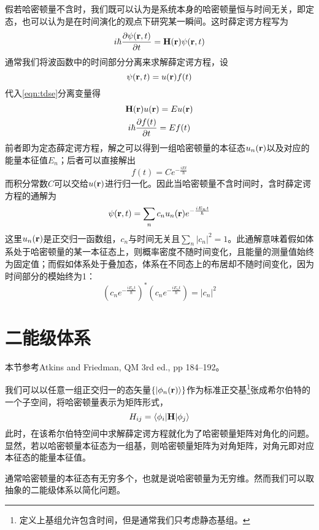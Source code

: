 假若哈密顿量不含时，我们既可以认为是系统本身的哈密顿量恒与时间无关，即定态，也可以认为是在时间演化的观点下研究某一瞬间。这时薛定谔方程写为
\begin{equation}\label{eqn:tdse}
i\hbar \dfrac{\partial \psi(\bm{\mathrm{r}},t)}{\partial t}=\bm{\mathrm{H}}(\bm{\mathrm{r}}) \psi(\bm{\mathrm{r}},t)
\end{equation}
通常我们将波函数中的时间部分分离来求解薛定谔方程，设
\begin{equation}\label{key}
\psi(\bm{\mathrm{r}},t)=u(\bm{\mathrm{r}})f(t)
\end{equation}
代入\eqref{eqn:tdse}分离变量得
\begin{gather}
\bm{\mathrm{H}}(\bm{\mathrm{r}}) u(\bm{\mathrm{r}})=E u(\bm{\mathrm{r}})\label{eqn:TISE}\\
i\hbar \dfrac{\partial f(t)}{\partial t}=Ef(t)\label{eqn:timepart}
\end{gather}
前者即为定态薛定谔方程，解之可以得到一组哈密顿量的本征态$ u_n(\bm{\mathrm{r}}) $以及对应的能量本征值$ E_n $；后者可以直接解出
\begin{equation}\label{key}
f(t)=Ce^{-\frac{iEt}{\hbar}}
\end{equation}
而积分常数$ C $可以交给$ u(\bm{\mathrm{r}}) $进行归一化。因此当哈密顿量不含时间时，含时薛定谔方程的通解为
\begin{equation}\label{key}
\psi(\bm{\mathrm{r}},t)=\sum_nc_nu_n(\bm{\mathrm{r}})e^{-\frac{iE_nt}{\hbar}}
\end{equation}
这里$ u_n(\bm{\mathrm{r}}) $是正交归一函数组，$ c_n $与时间无关且$ \sum_n |c_n|^2=1 $。此通解意味着假如体系处于哈密顿量的某一本征态上，则概率密度不随时间变化，且能量的测量值始终为固定值；而假如体系处于叠加态，体系在不同态上的布居却不随时间变化，因为时间部分的模始终为1：
\begin{equation}\label{key}
(c_ne^{-\frac{iE_nt}{\hbar}})^*(c_ne^{-\frac{iE_nt}{\hbar}})=|c_n|^2
\end{equation}

\section{二能级体系}
\begin{framed}
本节参考Atkins and Friedman, QM 3rd ed., pp 184--192。
\end{framed}
我们可以以任意一组正交归一的态矢量$ \{|\phi_n(\bm{\mathrm{r}})\rangle\} $作为标准正交基\footnote{定义上基组允许包含时间，但是通常我们只考虑静态基组。}张成希尔伯特的一个子空间，将哈密顿量表示为矩阵形式，
\begin{equation}\label{key}
H_{ij}=\langle \phi_i|\bm{\mathrm{H}}|\phi_j\rangle
\end{equation}
此时，在该希尔伯特空间中求解薛定谔方程就化为了哈密顿量矩阵对角化的问题。显然，若以哈密顿量本征态为一组基，则哈密顿量矩阵为对角矩阵，对角元即对应本征态的能量本征值。

通常哈密顿量的本征态有无穷多个，也就是说哈密顿量为无穷维。然而我们可以取抽象的二能级体系以简化问题。
